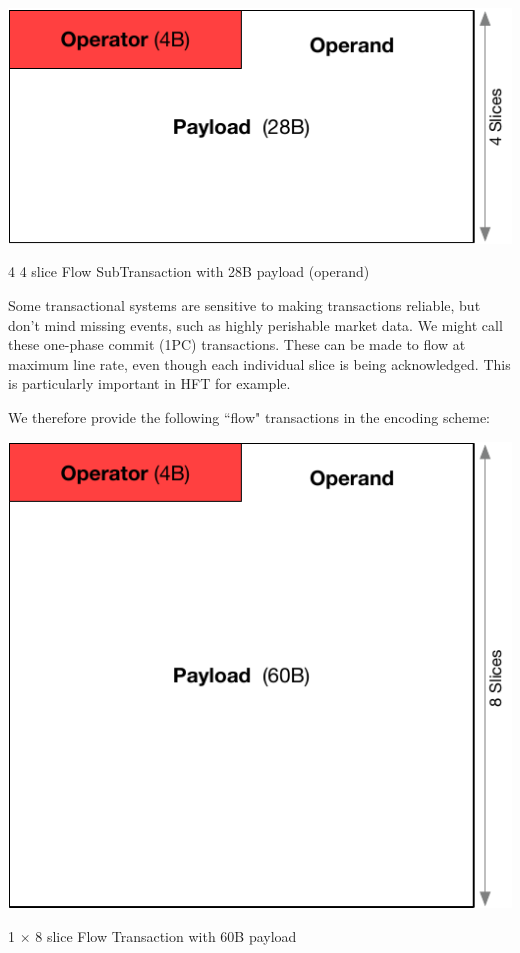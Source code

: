 \documentclass[../HFT-main.tex]{subfiles}
\begin{document}
\begin{marginfigure}
      \includegraphics[width=\linewidth]{../figures/4-slice-operator.pdf}
  \caption{4 4 slice Flow SubTransaction with 28B payload (operand) \vspace{15pt}} %
\end{marginfigure}

Some transactional systems are sensitive to making transactions reliable, but don't mind missing events, such as highly perishable market data.  We might call these one-phase commit (1PC) transactions. These can be made to flow at maximum line rate, even though each individual slice is being acknowledged. This is particularly important in HFT for example.

We therefore provide the following ``flow" transactions in the encoding scheme:

\begin{marginfigure}
        \includegraphics[width=\linewidth]{../figures/8-slice-operator.pdf}
  \caption{1 $\times$ 8 slice Flow  Transaction with 60B payload}
\end{marginfigure}
\end{document}
